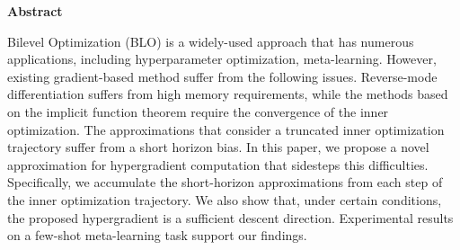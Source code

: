 \begin{center}
    \Large{\textbf{Abstract}}
\end{center}

Bilevel Optimization (BLO) is a widely-used approach that has numerous applications, including hyperparameter optimization, meta-learning. However, existing gradient-based method suffer from the following issues. Reverse-mode differentiation suffers from high memory requirements, while the methods based on the implicit function theorem require the convergence of the inner optimization. The approximations that consider a truncated inner optimization trajectory suffer from a short horizon bias. In this paper, we propose a novel approximation for hypergradient computation that sidesteps this difficulties. Specifically, we accumulate the short-horizon approximations from each step of the inner optimization trajectory. We also show that, under certain conditions, the proposed hypergradient is a sufficient descent direction. Experimental results on a few-shot meta-learning task support our findings.